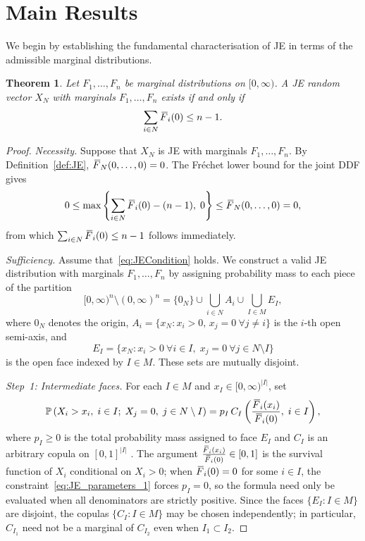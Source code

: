 \documentclass[letterpaper,12pt]{article}
\def \P {\mathbb{P}}
\numberwithin{equation}{section}
\newtheorem{theorem}{Theorem}[section]
\newcommand{\N}{{N}}
\newcommand{\M}{{M}}
\newcommand{\I}{{I}}
\newcommand{\F}{\,\overline{\kern-0.175em F\kern-0em}}
\begin{document}
{\section{Main Results}
\label{sec:main_results}

We begin by establishing the fundamental characterisation of JE in terms of the
admissible marginal distributions.

\begin{theorem}
\label{thm:JE_Characterisation_1}
Let $F_1,\dots,F_n$ be marginal distributions on $[0,\infty)$. A JE random
vector $X_{\N}$ with marginals $F_1,\dots,F_n$ exists if and only if
\begin{equation}
\label{eq:JECondition}
\sum_{i\in\N}\F_i(0)\le n-1.
\end{equation}
\end{theorem}

\begin{proof}
\textit{Necessity.}
Suppose that $X_{\N}$ is JE with marginals $F_1,\dots,F_n$. By
Definition~\ref{def:JE}, $\F_{\N}(0,\dots,0)=0$. The Fr\'{e}chet lower bound
for the joint DDF gives
\[
0 \le \max\left\{\sum_{i\in\N}\F_i(0)-(n-1),\;0\right\}
    \le \F_{\N}(0,\dots,0)=0,
\]
from which $\sum_{i\in\N}\F_i(0)\le n-1$ follows immediately.

\medskip
\noindent\textit{Sufficiency.}
Assume that~\eqref{eq:JECondition} holds. We construct a valid JE distribution
with marginals $F_1,\dots,F_n$ by assigning probability mass to each piece of the
partition
\[
[0,\infty)^n\setminus(0,\infty)^n
= \{0_{\N}\}
  \cup\bigcup_{i\in\N} A_i
  \cup\bigcup_{\I\in\M} E_{\I},
\]
where $0_{\N}$ denotes the origin, $A_i=\{x_{\N}:x_i>0,\,x_j=0\ \forall j\ne i\}$
is the $i$-th open semi-axis, and
\[
E_{\I}=\{x_{\N}: x_i>0\ \forall i\in\I,\;x_j=0\ \forall j\in\N\setminus\I\}
\]
is the open face indexed by $\I\in\M$. These sets are mutually disjoint.

\smallskip
\noindent\textit{Step~1: Intermediate faces.}
For each $\I\in\M$ and $x_{\I}\in[0,\infty)^{|\I|}$, set
\begin{equation}
\label{eq:JEProbFaces}
\P\left(X_i>x_i,\;i\in \I;\;X_j=0,\;j\in\N\setminus \I\right)
= p_{\I}\,C_{\I}\left(\frac{\F_i(x_i)}{\F_i(0)},\;i\in\I\right),
\end{equation}
where $p_{\I}\ge 0$ is the total probability mass assigned to face $E_\I$ and
$C_{\I}$ is an arbitrary copula on $[0,1]^{|\I|}$ \citep{Nelson2010}. The
argument $\frac{\F_i(x_i)}{\F_i(0)}\in[0,1]$ is the survival function of $X_i$
conditional on $X_i>0$; when $\F_i(0)=0$ for some $i\in\I$, the
constraint~\eqref{eq:JE_parameters_1} forces $p_\I=0$, so the formula need only
be evaluated when all denominators are strictly positive. Since the
faces $\{E_{\I}:\I\in\M\}$ are disjoint, the copulas $\{C_\I:\I\in\M\}$ may be
chosen independently; in particular, $C_{\I_1}$ need not be a marginal of
$C_{\I_2}$ even when $\I_1\subset\I_2$.


\end{proof}}
\end{document}
